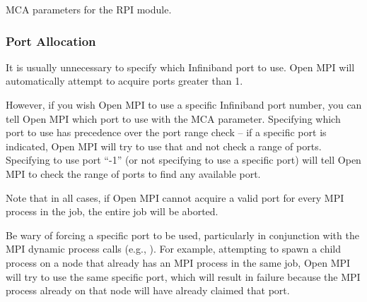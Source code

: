 \begin{table}[htbp]
  \begin{ssiparamtb}
%
%
%
%
%
%

  \end{ssiparamtb}
  \caption{MCA parameters for the  RPI module.}
  \label{tbl:mca-ompi-ib-mca-params}
\end{table}


\subsubsection{Port Allocation}

It is usually unnecessary to specify which Infiniband port to use.
Open MPI will automatically attempt to acquire ports greater than 1.

However, if you wish Open MPI to use a specific Infiniband port number, you
can tell Open MPI which port to use with the 
MCA parameter.
%
Specifying which port to use has precedence over the port range check
-- if a specific port is indicated, Open MPI will try to use that and not
check a range of ports.  Specifying to use port ``-1'' (or not
specifying to use a specific port) will tell Open MPI to check the range of
ports to find any available port.

Note that in all cases, if Open MPI cannot acquire a valid port for every
MPI process in the job, the entire job will be aborted.

Be wary of forcing a specific port to be used, particularly in
conjunction with the MPI dynamic process calls (e.g.,
).  For example, attempting to spawn a
child process on a node that already has an MPI process in the same
job, Open MPI will try to use the same specific port, which will result in
failure because the MPI process already on that node will have already
claimed that port.

